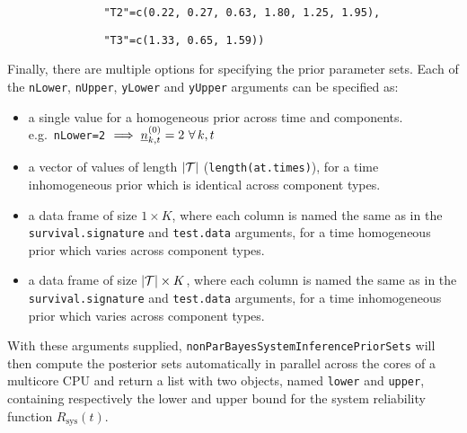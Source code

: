 \documentclass[12pt, a4paper]{elsarticle}
\newcommand{\Rsys}{R_\text{sys}}
\begin{document}
\noindent\texttt{~~~~~~~~~~~~~~~"T2"=c(0.22, 0.27, 0.63, 1.80, 1.25, 1.95),}

\noindent\texttt{~~~~~~~~~~~~~~~"T3"=c(1.33, 0.65, 1.59))}

Finally, there are multiple options for specifying the prior parameter
sets.  Each of the \texttt{nLower}, \texttt{nUpper}, \texttt{yLower}
and \texttt{yUpper} arguments can be specified as:
\begin{itemize}
  \item a single value for a homogeneous prior across time and components.  e.g.\ \texttt{nLower=2} $\implies \underline{n}^{(0)}_{k,t}=2 \ \forall\,k, t$
  \item a vector of values of length $|{\cal T}|$ (\texttt{length(at.times)}), for a time inhomogeneous prior which is identical across component types.
  \item a data frame of size $1\times K$, where each column is named the same as in the \texttt{survival.signature} and \texttt{test.data} arguments, for a time homogeneous prior which varies across component types.
  \item a data frame of size $|{\cal T}|\times K$, where each column is named the same as in the \texttt{survival.signature} and \texttt{test.data} arguments, for a time inhomogeneous prior which varies across component types.
\end{itemize}

With these arguments supplied,  \texttt{nonParBayesSystemInferencePriorSets} will then compute
the posterior sets automatically in parallel across the cores of a
multicore CPU and return a list with two objects, named \texttt{lower} 
and \texttt{upper}, containing respectively the lower and upper bound 
for the system reliability function $\Rsys(t)$.
\end{document}
